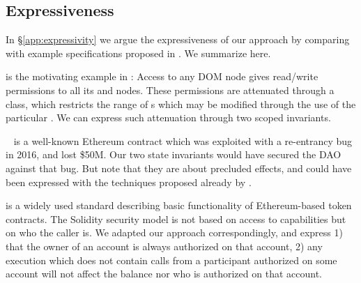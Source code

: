 \newcommand{\paragraphSDD}[1]{\vspace{.01cm}{\textit{#1}}}

\subsection{Expressiveness} 

In   \S \ref{app:expressivity} we argue the expressiveness of our approach by comparing with example specifications  proposed in \cite{OOPSLA22,dd,VerX}.
We   summarize here.

 

\paragraphSDD{DOM} is the motivating example  in \cite{dd}: Access to any DOM node
gives read/write  permissions to  all its  and  nodes. 
These permissions are attenuated   through a  class, %
 which restricts the range of s which may be modified through the use of the particular . 
We can express such  attenuation   through two scoped invariants.

\paragraphSDD{DAO} %
 ~\cite{Dao}  is a well-known Ethereum contract   which was exploited with a re-entrancy bug in 2016, 
and lost \$50M. 
Our two state invariants  would have secured the DAO against that bug. %
But note  that they are about precluded effects, and 
 could have been expressed with the techniques proposed already by \cite{MeyerDBC92}.
 
 \paragraphSDD{ERC20} is a widely used %
 standard describing  basic functionality of Ethereum-based token 
contracts. 
The Solidity security model is not based on access to  capabilities but on who the caller  is. 
We  adapted our approach correspondingly, and 
%
express 1) that  the owner of an account is always authorized on that account,  2) any execution which does not contain calls from a participant  authorized on some account will not affect the balance nor  who is authorized on  that account. 

